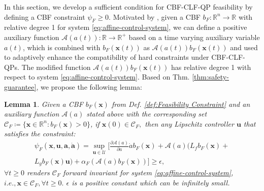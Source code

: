 \documentclass[letterpaper, 10 pt, conference]{ieeeconf}
\newtheorem{lemma}{Lemma}
\theoremstyle{definition}
\begin{document}
In this section, we develop a sufficient condition for CBF-CLF-QP feasibility by defining a CBF constraint $\psi_{F}\ge0$. Motivated by \cite{liu2023auxiliary}, given a CBF $b_{F}:\mathbb{R}^{n}\to\mathbb{R}$ with relative degree 1 for system \eqref{eq:affine-control-system}, we can define a positive auxiliary function $\mathcal{A}(a(t)):\mathbb{R}\to\mathbb{R}^{+}$ based on a time varying auxiliary variable $a(t)$, which is combined with $b_{F}(\boldsymbol{x}(t))$ as $\mathcal{A}(a(t))b_{F}(\boldsymbol{x}(t))$ and used to adaptively enhance the compatibility of hard constraints under CBF-CLF-QPs. The modified function $\mathcal{A}(a(t))b_{F}(\boldsymbol{x}(t))$ has relative degree 1 with respect to system \eqref{eq:affine-control-system}. Based on Thm. \ref{thm:safety-guarantee}, we propose the following lemma:

\begin{lemma}
\label{lemma:Auxiliary equation CBF}
Given a CBF $b_{F}(\boldsymbol{x})$ from Def. \ref{def:Feasibility Constraint} and an auxiliary function $\mathcal{A}(a)$ stated above with the corresponding set $\mathcal C_{F}\coloneqq \{\boldsymbol{x}\in\mathbb{R}^{n}:b_{F}(\boldsymbol{x})> 0\}$, if $\boldsymbol{x}(0) \in \mathcal {C}_{F},$ then any Lipschitz controller $\boldsymbol{u}$ that satisfies the constraint:
\begin{equation}
\label{eq:modified CBF constraint}
\begin{split}
\psi_{F}(\boldsymbol{x},\boldsymbol{u},\boldsymbol{a},\dot{\boldsymbol{a}})=\sup_{\boldsymbol{u}\in \mathcal U}[\frac{\partial \mathcal{A}(a)}{\partial a}\dot{a}b_{F}(\boldsymbol{x})+ \mathcal{A}(a)(L_{f}b_{F}(\boldsymbol{x})+\\L_{g}b_{F}(\boldsymbol{x})\boldsymbol{u})+\alpha_{F}(\mathcal{A}(a)b_{F}(\boldsymbol{x}))]\ge \epsilon,
\end{split}
\end{equation}
$\forall t\ge 0$ renders $\mathcal {C}_{F}$ forward invariant for system \eqref{eq:affine-control-system}, $i.e., \boldsymbol{x} \in \mathcal {C}_{F}, \forall t\ge 0.$ $\epsilon$ is a positive constant which can be infinitely small. 
\end{lemma}
\end{document}
